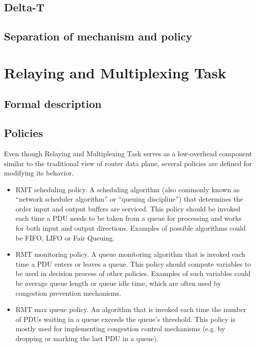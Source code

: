         \subsection{Delta-T}

        \subsection{Separation of mechanism and policy}

    \section{Relaying and Multiplexing Task}

        \subsection{Formal description}

        \subsection{Policies}
            Even though Relaying and Multiplexing Task serves as a low-overhead component similar to the traditional view of router data plane, several policies are defined for modifying its behavior.

            \begin{itemize}
                \item RMT scheduling policy. A scheduling algorithm (also commonly known as ``network scheduler algorithm'' or ``queuing discipline'') that determines the order input and output buffers are serviced. This policy should be invoked each time a PDU needs to be taken from a queue for processing and works for both input and output directions. Examples of possible algorithms could be FIFO, LIFO or Fair Queuing.
                \item RMT monitoring policy. A queue monitoring algorithm that is invoked each time a PDU enters or leaves a queue. This policy should compute variables to be used in decision process of other policies. Examples of such variables could be average queue length or queue idle time, which are often used by congestion prevention mechanisms.
                \item RMT max queue policy. An algorithm that is invoked each time the number of PDUs waiting in a queue exceeds the queue's threshold. This policy is mostly used for implementing congestion control mechanisms (e.g. by dropping or marking the last PDU in a queue).
            \end{itemize}


